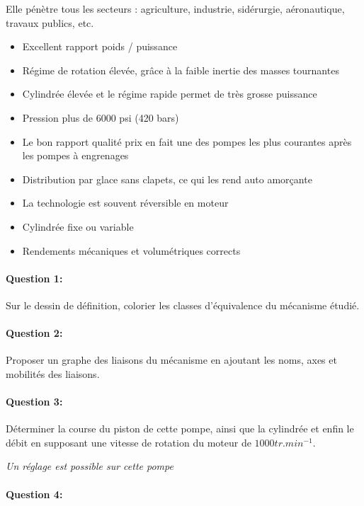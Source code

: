 Elle pénètre tous les secteurs : agriculture, industrie, sidérurgie, aéronautique, travaux publics, etc.

\begin{itemize}
 \item Excellent rapport poids / puissance
 \item Régime de rotation élevée, grâce à la faible inertie des masses tournantes
 \item Cylindrée élevée et le régime rapide permet de très grosse puissance
 \item Pression plus de 6000 psi (420 bars)
 \item Le bon rapport qualité prix en fait une des pompes les plus courantes après les pompes à engrenages
 \item Distribution par glace sans clapets, ce qui les rend auto amorçante
 \item La technologie est souvent réversible en moteur
 \item Cylindrée fixe ou variable
 \item Rendements mécaniques et volumétriques corrects
\end{itemize}

\paragraph{Question 1:}
Sur le dessin de définition, colorier les classes d'équivalence du mécanisme étudié.

\paragraph{Question 2:}

Proposer un graphe des liaisons du mécanisme en ajoutant les noms, axes et mobilités des liaisons.

\paragraph{Question 3:}

Déterminer la course du piston de cette pompe, ainsi que la cylindrée et enfin le débit en supposant une vitesse de rotation du moteur de $1000 tr.min^{-1}$.

\textit{Un réglage est possible sur cette pompe}

\paragraph{Question 4:}

